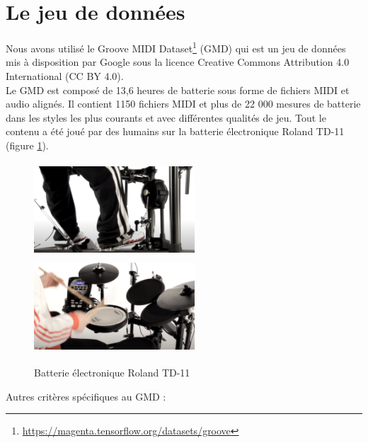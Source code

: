 \section{Le jeu de données}
\label{gmd}
Nous avons utilisé le Groove MIDI
Dataset\footnote{\url{https://magenta.tensorflow.org/datasets/groove}}
\cite{groove2019} (GMD) qui est un jeu de données mis à disposition par Google
sous la licence Creative Commons Attribution 4.0 International (CC BY 4.0).\\
Le GMD est composé de 13,6 heures de batterie sous forme de fichiers MIDI et
audio alignés. Il contient 1150 fichiers MIDI et plus de 22 000 mesures de
batterie dans les styles les plus courants et avec différentes qualités de jeu.
Tout le contenu a été joué par des humains sur la batterie électronique Roland
TD-11 (figure \ref{electro_drums}).
\begin{figure}[h]
	\centering
	\includegraphics[height=35mm, width=60mm]
    {z_images/4_experimentations/0_groove/0_roland.png}\ \ 
	\includegraphics[height=35mm, width=60mm]
    {z_images/4_experimentations/0_groove/1_roland.png}
	\caption[Batterie électronique Roland TD-11]{Batterie électronique Roland
TD-11\footnotemark}
	\label{electro_drums}
	
\end{figure}
Autres critères spécifiques au GMD :
